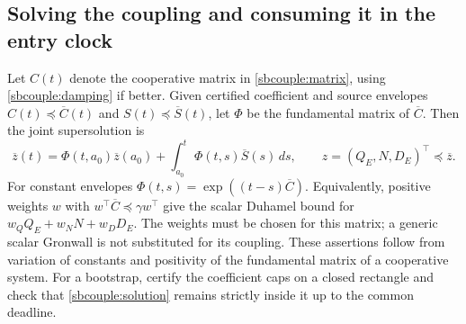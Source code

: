 \documentclass{article} %
\theoremstyle{plain}
\theoremstyle{definition}
\theoremstyle{remark}
\begin{document}
\subsection{Solving the coupling and consuming it in the entry clock}

Let $C(t)$ denote the cooperative matrix in \eqref{sbcouple:matrix},
using \eqref{sbcouple:damping} if better. Given certified coefficient
and source envelopes $C(t)\preceq\overline C(t)$ and
$S(t)\preceq\overline S(t)$, let $\Phi$ be the fundamental matrix
of $\overline C$. Then the joint supersolution is
\begin{equation}\label{sbcouple:solution}
 \overline z(t)=\Phi(t,a_0)\overline z(a_0)
             +\int_{a_0}^t\Phi(t,s)\overline S(s)\,ds,
 \qquad z=(Q_E,N,D_E)^\top\preceq\overline z.
\end{equation}
For constant envelopes $\Phi(t,s)=\exp((t-s)\overline C)$.
Equivalently, positive weights $w$ with
$w^\top\overline C\preceq\gamma w^\top$ give the scalar Duhamel
bound for $w_QQ_E+w_NN+w_DD_E$. The weights must be chosen for this
matrix; a generic scalar Gronwall is not substituted for its coupling.
These assertions follow from variation of constants and positivity of
the fundamental matrix of a cooperative system. For a bootstrap, certify
the coefficient caps on a closed rectangle and check that
\eqref{sbcouple:solution} remains strictly inside it up to the common
deadline.
\end{document}
